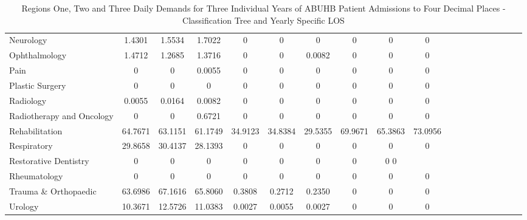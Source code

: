 \documentclass[thesis.tex]{subfiles}
\begin{document}
\begin{landscape}
\begin{table}[h!]
{\begin{tabular}{lcccccccccccccccccc}
Neurology	&1.4301	&1.5534	&1.7022&	0&	0	&0&	0&	0&	0\\
Ophthalmology	&1.4712	&1.2685	&1.3716	&0&	0&	0.0082&	0&	0&	0\\
Pain	&0	&0	&0.0055	&0	&0&	0&	0	&0	&0\\
Plastic Surgery	&0	&0	&0	&0&	0&	0	&0	&0	&0\\
Radiology&	0.0055&	0.0164	&0.0082	&0&	0&	0	&0	&0	&0\\
Radiotherapy and Oncology	&0	&0&	0.6721&	0	&0	&0	&0	&0&	0\\
Rehabilitation	&64.7671	&63.1151&	61.1749	&34.9123	&34.8384&	29.5355	&69.9671	&65.3863	&73.0956\\
Respiratory	&29.8658	&30.4137	&28.1393&	0	&0	&0	&0	&0	&0\\
Restorative Dentistry&	0	&0&	0	&0	&0	&0&	0&	0	0\\
Rheumatology	&0	&0	&0	&0	&0	&0	&0&	0&	0\\
Trauma \& Orthopaedic	&63.6986&	67.1616&	65.8060	&0.3808	&0.2712	&0.2350&	0	&0	&0\\
Urology&	10.3671&	12.5726	&11.0383&	0.0027&	0.0055	&0.0027&	0	&0	&0\\\bottomrule
\end{tabular}  } 
\caption{Regions One, Two and Three Daily Demands for Three Individual Years of ABUHB Patient Admissions to Four Decimal Places - Classification Tree and Yearly Specific LOS}
    \label{apptab:LinkedDemands10a}
\end{table}  



\end{landscape}
\end{document}
